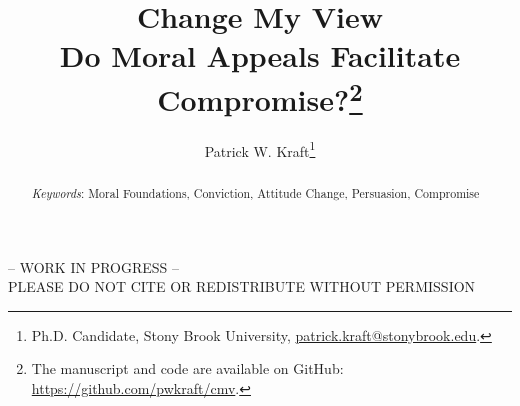 \documentclass[12pt]{article}
\author{Patrick W. Kraft\footnote{Ph.D. Candidate, Stony Brook University, \href{mailto:patrick.kraft@stonybrook.edu}{patrick.kraft@stonybrook.edu}.
}}
\title{Change My View\\
\large{Do Moral Appeals Facilitate Compromise?}\footnote{The manuscript and code are available on GitHub: \url{https://github.com/pwkraft/cmv}.}}
\date{}
\begin{document}
\maketitle
\doublespacing
\thispagestyle{empty}

\begin{center}
-- WORK IN PROGRESS -- \\
PLEASE DO NOT CITE OR REDISTRIBUTE WITHOUT PERMISSION
\end{center} 

\hfill
\begin{abstract}\singlespacing
\noindent 


\vspace{\baselineskip}
\noindent \textit{Keywords}: Moral Foundations, Conviction, Attitude Change, Persuasion, Compromise
\end{abstract}
\hfill

\newpage\setcounter{page}{1}


\clearpage
\singlespacing


\end{document}
